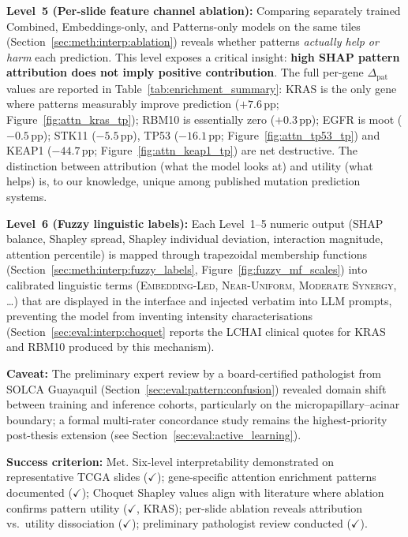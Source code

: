 \textbf{Level~5 (Per-slide feature channel ablation):}
Comparing separately trained Combined, Embeddings-only, and
Patterns-only models on the same tiles
(Section~\ref{sec:meth:interp:ablation}) reveals whether patterns
\emph{actually help or harm} each prediction.
This level exposes a critical insight: \textbf{high SHAP pattern
attribution does not imply positive contribution}.
The full per-gene $\Delta_{\mathrm{pat}}$ values are reported in
Table~\ref{tab:enrichment_summary}: KRAS is the only gene where
patterns measurably improve prediction
($+7.6$\,pp; Figure~\ref{fig:attn_kras_tp}); RBM10 is essentially
zero ($+0.3$\,pp); EGFR is moot ($-0.5$\,pp); STK11
($-5.5$\,pp), TP53 ($-16.1$\,pp; Figure~\ref{fig:attn_tp53_tp}) and
KEAP1 ($-44.7$\,pp; Figure~\ref{fig:attn_keap1_tp}) are net
destructive.
The distinction between attribution (what the model looks at) and
utility (what helps) is, to our knowledge, unique among published
mutation prediction systems.

\textbf{Level~6 (Fuzzy linguistic labels):}
Each Level~1--5 numeric output (SHAP balance, Shapley spread,
Shapley individual deviation, interaction magnitude, attention
percentile) is mapped through trapezoidal membership functions
(Section~\ref{sec:meth:interp:fuzzy_labels},
Figure~\ref{fig:fuzzy_mf_scales}) into calibrated linguistic terms
(\textsc{Embedding-Led}, \textsc{Near-Uniform},
\textsc{Moderate Synergy}, \ldots) that are displayed in the
interface and injected verbatim into LLM prompts, preventing the
model from inventing intensity characterisations
(Section~\ref{sec:eval:interp:choquet} reports the LCHAI clinical
quotes for KRAS and RBM10 produced by this mechanism).

\textbf{Caveat:} The preliminary expert review by a board-certified
pathologist from SOLCA Guayaquil
(Section~\ref{sec:eval:pattern:confusion}) revealed domain shift
between training and inference cohorts, particularly on the
micropapillary--acinar boundary; a formal multi-rater concordance
study remains the highest-priority post-thesis extension
(see Section~\ref{sec:eval:active_learning}).

\textbf{Success criterion:} Met.
Six-level interpretability demonstrated on representative TCGA
slides ($\checkmark$); gene-specific attention enrichment patterns
documented ($\checkmark$); Choquet Shapley values align with
literature where ablation confirms pattern utility ($\checkmark$,
KRAS); per-slide ablation reveals attribution vs.\ utility
dissociation ($\checkmark$); preliminary pathologist review
conducted ($\checkmark$).
 
